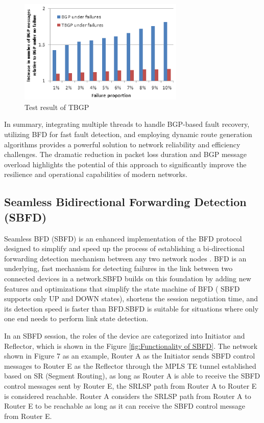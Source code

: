 \documentclass[12pt]{article}
\begin{document}
\begin{figure}[h]
    \centering
    \includegraphics[width=0.7\textwidth]{Graph/TBGP.png}
    \caption{Test result of TBGP \cite{ref9}} 
    \label{fig:Test result of TBGP} 
    
\end{figure}

In summary, integrating multiple threads to handle BGP-based fault recovery, utilizing BFD for fast fault detection, and employing dynamic route generation algorithms provides a powerful solution to network reliability and efficiency challenges. The dramatic reduction in packet loss duration and BGP message overload highlights the potential of this approach to significantly improve the resilience and operational capabilities of modern networks.


\subsection{Seamless Bidirectional Forwarding Detection (SBFD)}
Seamless BFD (SBFD) is an enhanced implementation of the BFD protocol designed to simplify and speed up the process of establishing a bi-directional forwarding detection mechanism between any two network nodes \cite{ref10}. BFD is an underlying, fast mechanism for detecting failures in the link between two connected devices in a network.SBFD builds on this foundation by adding new features and optimizations that simplify the state machine of BFD ( SBFD supports only UP and DOWN states), shortens the session negotiation time, and its detection speed is faster than BFD.SBFD is suitable for situations where only one end needs to perform link state detection.

In an SBFD session, the roles of the device are categorized into Initiator and Reflector, which is shown in the Figure \ref{fig:Functionality of SBFD}. The network shown in Figure 7 as an example, Router A as the Initiator sends SBFD control messages to Router E as the Reflector through the MPLS TE tunnel established based on SR (Segment Routing), as long as Router A is able to receive the SBFD control messages sent by Router E, the SRLSP path from Router A to Router E is considered reachable. Router A considers the SRLSP path from Router A to Router E to be reachable as long as it can receive the SBFD control message from Router E.
\end{document}
